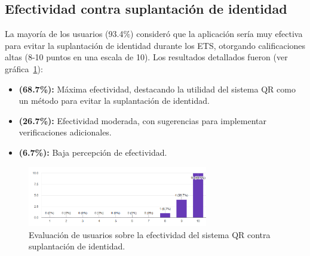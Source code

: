 \subsection{Efectividad contra suplantación de identidad}

La mayoría de los usuarios (93.4\%) consideró que la aplicación sería muy efectiva para evitar la suplantación de identidad durante los ETS, otorgando calificaciones altas (8-10 puntos en una escala de 10). Los resultados detallados fueron (ver gráfica~\ref{fig:efectividad}):

\begin{itemize}
	\item \textbf{(68.7\%):} Máxima efectividad, destacando la utilidad del sistema QR como un método para evitar la suplantación de identidad.
	\item \textbf{(26.7\%):} Efectividad moderada, con sugerencias para implementar verificaciones adicionales.
	\item \textbf{(6.7\%):} Baja percepción de efectividad.
\end{itemize}

\begin{figure}[H]
	\centering
	\includegraphics[width=0.7\textwidth]{images/efectividad.png}
	\caption{Evaluación de usuarios sobre la efectividad del sistema QR contra suplantación de identidad.}
	\label{fig:efectividad}
\end{figure}
